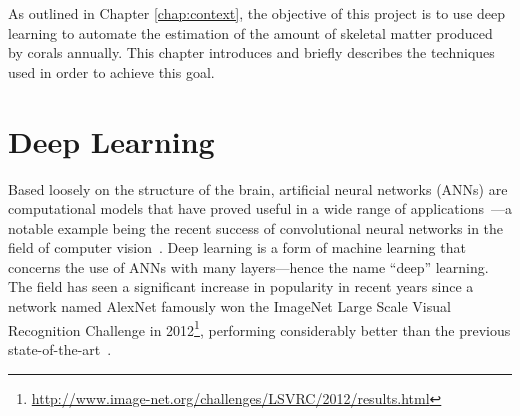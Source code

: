 


As outlined in Chapter \ref{chap:context}, the objective of this project is to use deep learning to automate the estimation of the amount of skeletal matter produced by corals annually. This chapter introduces and briefly describes the techniques used in order to achieve this goal.

\section{Deep Learning}
\label{sec:deeplearning}

Based loosely on the structure of the brain, artificial neural networks (ANNs) are computational models that have proved useful in a wide range of applications~\cite{lecun2015deep, healthcare, nlp}---a notable example being the recent success of convolutional neural networks in the field of computer vision~\cite{compvision, semanticsegreview}. Deep learning is a form of machine learning that concerns the use of ANNs with many layers---hence the name ``deep'' learning. The field has seen a significant increase in popularity in recent years since a network named AlexNet famously won the ImageNet Large Scale Visual Recognition Challenge in 2012\footnote{\url{http://www.image-net.org/challenges/LSVRC/2012/results.html}}, performing considerably better than the previous state-of-the-art~\cite{alexnet}.

